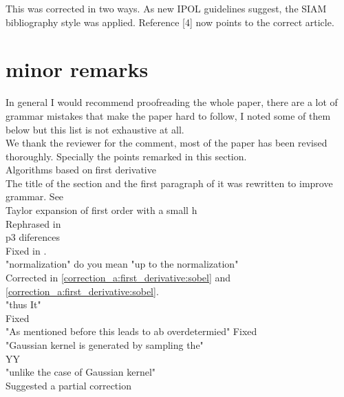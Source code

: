 \documentclass[a4paper,10pt]{report}
\begin{document}
\ans This was corrected in two ways. As new IPOL guidelines suggest, the SIAM bibliography style was applied. Reference [4] now points to the correct article.\\

\section{minor remarks}

\que In general I would recommend proofreading the whole paper, there are a lot of grammar
mistakes that make the paper hard to follow, I noted some of them below but this list is not exhaustive at all.\\

\ans We thank the reviewer for the comment, most of the paper has been revised thoroughly. Specially the points remarked in this section.\\

\que Algorithms based onfirst derivative \\
\ans The title of the section and the first paragraph of it was rewritten to improve grammar. See  \\

\que Taylor expansion of first order with a small h\\

\ans Rephrased in \\

\que p3 diferences\\

\ans Fixed in . \\

\que "normalization" do you mean "up to the normalization"\\

\ans Corrected in \ref{correction_a:first_derivative:sobel} and \ref{correction_a:first_derivative:sobel}.\\

\que "thus It"\\

\ans Fixed\\

\que "As mentioned before this leads to ab overdetermied"
\ans Fixed\\ 

\que "Gaussian kernel is generated by sampling the"\\
\ans YY\\
\que "unlike the case of Gaussian kernel"\\
\ans Suggested a partial correction\\
\end{document}
